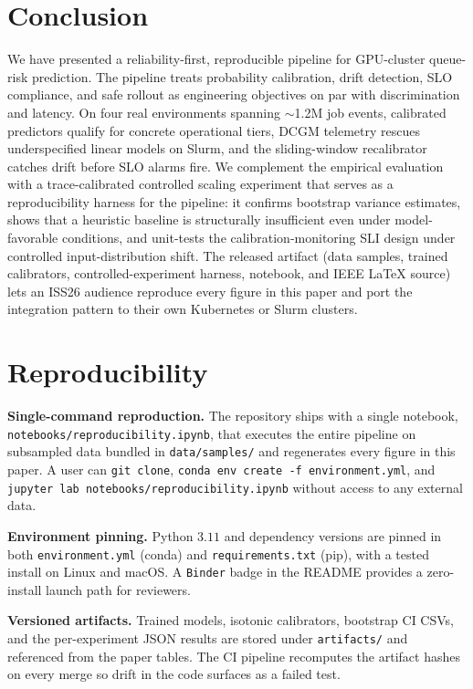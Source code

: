 \documentclass[conference]{IEEEtran}
\begin{document}
\section{Conclusion}
We have presented a reliability-first, reproducible pipeline for GPU-cluster queue-risk prediction. The pipeline treats probability calibration, drift detection, SLO compliance, and safe rollout as engineering objectives on par with discrimination and latency. On four real environments spanning $\sim$1.2M job events, calibrated predictors qualify for concrete operational tiers, DCGM telemetry rescues underspecified linear models on Slurm, and the sliding-window recalibrator catches drift before SLO alarms fire. We complement the empirical evaluation with a trace-calibrated controlled scaling experiment that serves as a reproducibility harness for the pipeline: it confirms bootstrap variance estimates, shows that a heuristic baseline is structurally insufficient even under model-favorable conditions, and unit-tests the calibration-monitoring SLI design under controlled input-distribution shift. The released artifact (data samples, trained calibrators, controlled-experiment harness, notebook, and IEEE \LaTeX{} source) lets an ISS26 audience reproduce every figure in this paper and port the integration pattern to their own Kubernetes or Slurm clusters.

\section{Reproducibility}
\label{sec:repro}
\textbf{Single-command reproduction.} The repository ships with a single notebook, \texttt{notebooks/reproducibility.ipynb}, that executes the entire pipeline on subsampled data bundled in \texttt{data/samples/} and regenerates every figure in this paper. A user can \texttt{git clone}, \texttt{conda env create -f environment.yml}, and \texttt{jupyter lab notebooks/reproducibility.ipynb} without access to any external data.

\textbf{Environment pinning.} Python $3.11$ and dependency versions are pinned in both \texttt{environment.yml} (conda) and \texttt{requirements.txt} (pip), with a tested install on Linux and macOS. A \texttt{Binder} badge in the README provides a zero-install launch path for reviewers.

\textbf{Versioned artifacts.} Trained models, isotonic calibrators, bootstrap CI CSVs, and the per-experiment JSON results are stored under \texttt{artifacts/} and referenced from the paper tables. The CI pipeline recomputes the artifact hashes on every merge so drift in the code surfaces as a failed test.
\end{document}
